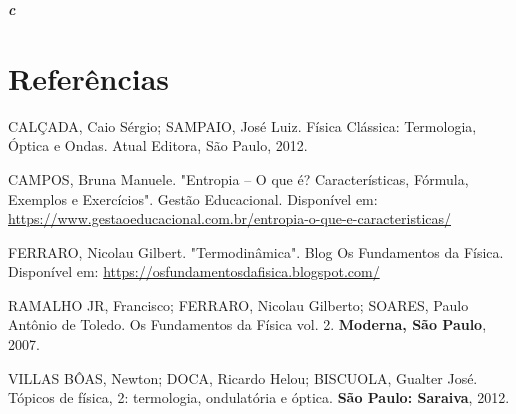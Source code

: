\documentclass[12pt]{article}
\newenvironment{resposta*}
{\bf Resposta:\\ }
{}
\begin{document}
\begin{resposta*}
{\it \textbf{c}}
\end{resposta*}

\hypertarget{x-referências}{\section{Referências}}
CALÇADA, Caio Sérgio; SAMPAIO, José Luiz. Física Clássica: Termologia, Óptica e Ondas. Atual Editora, São Paulo, 2012.


CAMPOS, Bruna Manuele. "Entropia – O que é? Características, Fórmula, Exemplos e Exercícios". Gestão Educacional. Disponível em: \href{https://www.gestaoeducacional.com.br/entropia-o-que-e-caracteristicas/}{https://www.gestaoeducacional.com.br/entropia-o-que-e-caracteristicas/}


FERRARO, Nicolau Gilbert. "Termodinâmica". Blog Os Fundamentos da Física. Disponível em: \href{https://osfundamentosdafisica.blogspot.com/}{https://osfundamentosdafisica.blogspot.com/}


RAMALHO JR, Francisco; FERRARO, Nicolau Gilberto; SOARES, Paulo Antônio de Toledo. Os Fundamentos da Física vol. 2. \textbf{Moderna, São Paulo}, 2007.


VILLAS BÔAS, Newton; DOCA, Ricardo Helou; BISCUOLA, Gualter José. Tópicos de física, 2: termologia, ondulatória e óptica. \textbf{São Paulo: Saraiva}, 2012.
\end{document}
